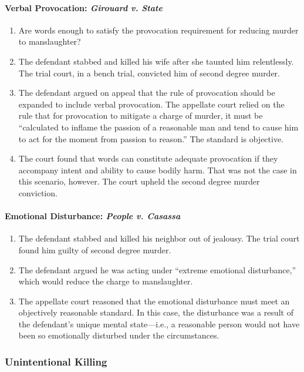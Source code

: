 \paragraph{Verbal Provocation: \emph{Girouard v. State}}

\begin{enumerate}
    \item Are words enough to satisfy the provocation requirement for reducing murder to manslaughter?
    \item The defendant stabbed and killed his wife after she taunted him relentlessly. The trial court, in a bench trial, convicted him of second degree murder.
    \item The defendant argued on appeal that the rule of provocation should be expanded to include verbal provocation. The appellate court relied on the rule that for provocation to mitigate a charge of murder, it must be ``calculated to inflame the passion of a reasonable man and tend to cause him to act for the moment from passion to reason.'' The standard is objective.
    \item The court found that words can constitute adequate provocation if they accompany intent and ability to cause bodily harm. That was not the case in this scenario, however. The court upheld the second degree murder conviction.
\end{enumerate}

\paragraph{Emotional Disturbance: \emph{People v. Casassa}}

\begin{enumerate}
    \item The defendant stabbed and killed his neighbor out of jealousy. The trial court found him guilty of second degree murder.
    \item The defendant argued he was acting under ``extreme emotional disturbance,'' which would reduce the charge to manslaughter.
    \item The appellate court reasoned that the emotional disturbance must meet an objectively reasonable standard. In this case, the disturbance was a result of the defendant's unique mental state---i.e., a reasonable person would not have been so emotionally disturbed under the circumstances.
\end{enumerate}

\subsubsection{Unintentional Killing}

